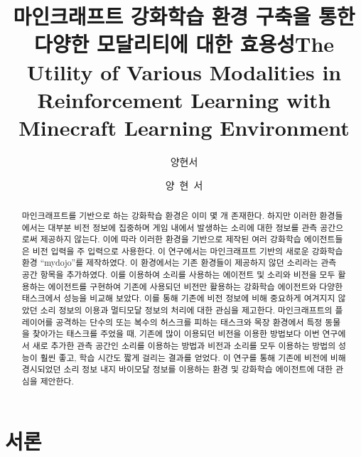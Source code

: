 \documentclass[oneside, under, ko]{snuthesis}
\title{마인크래프트 강화학습 환경 구축을 통한 다양한 모달리티에 대한 효용성}
\title*{The Utility of Various Modalities in Reinforcement Learning with Minecraft Learning Environment}
\author{양현서}
\author*{양~현~서} %
\begin{document}
\makefrontcover

\cleardoublepage

\renewcommand{\abstractname}{국문초록}
\begin{abstract}
	마인크래프트를 기반으로 하는 강화학습 환경은 이미 몇 개 존재한다. 하지만 이러한 환경들에서는 대부분 비전 정보에 집중하며 게임 내에서 발생하는 소리에 대한 정보를 관측 공간으로써 제공하지 않는다. 이에 따라 이러한 환경을 기반으로 제작된 여러 강화학습 에이전트들은 비전 입력을 주 입력으로 사용한다. 이 연구에서는 마인크래프트 기반의 새로운 강화학습 환경 “mydojo”를 제작하였다. 이 환경에서는 기존 환경들이 제공하지 않던 소리라는 관측 공간 항목을 추가하였다. 이를 이용하여 소리를 사용하는 에이전트 및 소리와 비전을 모두 활용하는 에이전트를 구현하여 기존에 사용되던 비전만 활용하는 강화학습 에이전트와 다양한 태스크에서 성능을 비교해 보았다. 이를 통해 기존에 비전 정보에 비해 중요하게 여겨지지 않았던 소리 정보의 이용과 멀티모달 정보의 처리에 대한 관심을 제고한다. 마인크래프트의 플레이어를 공격하는 단수의 또는 복수의 허스크를 피하는 태스크와 목장 환경에서 특정 동물을 찾아가는 태스크를 주었을 때, 기존에 많이 이용되던 비전을 이용한 방법보다 이번 연구에서 새로 추가한 관측 공간인 소리를 이용하는 방법과 비전과 소리를 모두 이용하는 방법의 성능이 훨씬 좋고, 학습 시간도 짧게 걸리는 결과를 얻었다. 이 연구를 통해 기존에 비전에 비해 경시되었던 소리 정보 내지 바이모달 정보를 이용하는 환경 및 강화학습 에이전트에 대한 관심을 제안한다.
\end{abstract}

\tableofcontents

\cleardoublepage

\doublespacing
\renewcommand{\baselinestretch}{1.7}
\chapter{서론}
\end{document}
